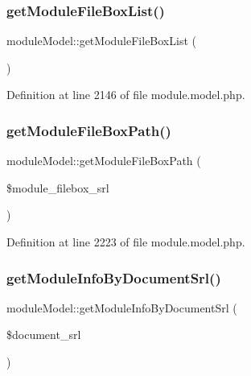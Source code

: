 \subsubsection{\texorpdfstring{get\+Module\+File\+Box\+List()}{getModuleFileBoxList()}}
{\footnotesize\ttfamily module\+Model\+::get\+Module\+File\+Box\+List (\begin{DoxyParamCaption}{ }\end{DoxyParamCaption})}



Definition at line 2146 of file module.\+model.\+php.

\mbox{\label{classmoduleModel_ac1183d568d6dab443a83c8618e6eb348}} 
\subsubsection{\texorpdfstring{get\+Module\+File\+Box\+Path()}{getModuleFileBoxPath()}}
{\footnotesize\ttfamily module\+Model\+::get\+Module\+File\+Box\+Path (\begin{DoxyParamCaption}\item[{}]{\$module\+\_\+filebox\+\_\+srl }\end{DoxyParamCaption})}



Definition at line 2223 of file module.\+model.\+php.

\mbox{\label{classmoduleModel_a6b3ba81393e32a934f7bff65f05663d5}} 
\subsubsection{\texorpdfstring{get\+Module\+Info\+By\+Document\+Srl()}{getModuleInfoByDocumentSrl()}}
{\footnotesize\ttfamily module\+Model\+::get\+Module\+Info\+By\+Document\+Srl (\begin{DoxyParamCaption}\item[{}]{\$document\+\_\+srl }\end{DoxyParamCaption})}



